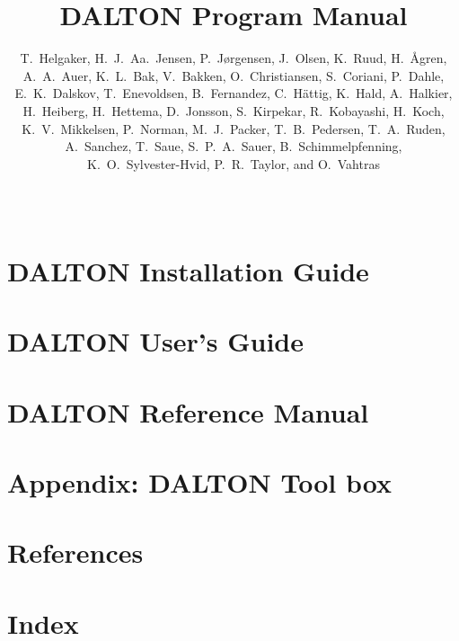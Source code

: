 \documentclass[11pt]{report}
\begin{document}
%

%
\baselineskip=15pt
%
\title{DALTON Program Manual}

%
\author{T.~Helgaker, H.~J.~Aa.~Jensen, P.~J{\o}rgensen, J.~Olsen,
K.~Ruud, H.~{\AA}gren,\smallskip\\ 
A.~A.~Auer,
K.~L.~Bak,
V.~Bakken,
O.~Christiansen,
S.~Coriani,
P.~Dahle,\\
E.~K.~Dalskov,
T.~Enevoldsen,
B.~Fernandez,
C.~H{\"a}ttig,
K.~Hald,
A.~Halkier,\\
H.~Heiberg,
H.~Hettema,
D.~Jonsson,
S.~Kirpekar,
R.~Kobayashi,
H.~Koch,\\
K.~V.~Mikkelsen,
P.~Norman,
M.~J.~Packer,
T.~B.~Pedersen,
T.~A.~Ruden,\\
A.~Sanchez,
T.~Saue,
S.~P.~A.~Sauer,
B.~Schimmelpfenning,\\
K.~O.~Sylvester-Hvid,
P.~R.~Taylor,
and O.~Vahtras}
%
\date{\mbox{\ }}
%
\maketitle
%



\part{DALTON Installation Guide}


\part{DALTON User's Guide}















\part{DALTON Reference Manual}






















\part{Appendix: DALTON Tool box}

\part{References}

%
\part{Index}
\printindex
\end{document}

